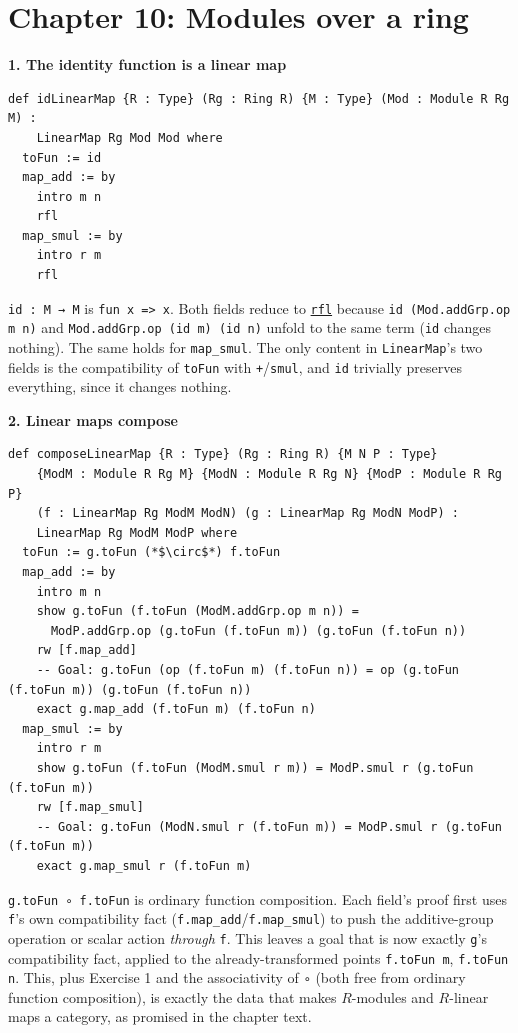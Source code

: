 \section{Chapter 10: Modules over a ring}\label{sec:14-appendix-solutions:09-chapter-10:1}

\textbf{1. The identity function is a linear map}

\begin{lstlisting}
def idLinearMap {R : Type} (Rg : Ring R) {M : Type} (Mod : Module R Rg M) :
    LinearMap Rg Mod Mod where
  toFun := id
  map_add := by
    intro m n
    rfl
  map_smul := by
    intro r m
    rfl
\end{lstlisting}

\texttt{id : M → M} is \texttt{fun x => x}. Both fields reduce to \href{https://lean-lang.org/doc/reference/latest/Tactic-Proofs/Tactic-Reference/}{\texttt{rfl}} because \texttt{id (Mod.addGrp.op m n)} and \texttt{Mod.addGrp.op (id m) (id n)} unfold to the same term (\texttt{id} changes nothing). The same holds for \texttt{map\_\allowbreak{}smul}. The only content in \texttt{LinearMap}'s two fields is the compatibility of \texttt{toFun} with \texttt{+}/\texttt{smul}, and \texttt{id} trivially preserves everything, since it changes nothing.

\textbf{2. Linear maps compose}

\begin{lstlisting}
def composeLinearMap {R : Type} (Rg : Ring R) {M N P : Type}
    {ModM : Module R Rg M} {ModN : Module R Rg N} {ModP : Module R Rg P}
    (f : LinearMap Rg ModM ModN) (g : LinearMap Rg ModN ModP) :
    LinearMap Rg ModM ModP where
  toFun := g.toFun (*$\circ$*) f.toFun
  map_add := by
    intro m n
    show g.toFun (f.toFun (ModM.addGrp.op m n)) =
      ModP.addGrp.op (g.toFun (f.toFun m)) (g.toFun (f.toFun n))
    rw [f.map_add]
    -- Goal: g.toFun (op (f.toFun m) (f.toFun n)) = op (g.toFun (f.toFun m)) (g.toFun (f.toFun n))
    exact g.map_add (f.toFun m) (f.toFun n)
  map_smul := by
    intro r m
    show g.toFun (f.toFun (ModM.smul r m)) = ModP.smul r (g.toFun (f.toFun m))
    rw [f.map_smul]
    -- Goal: g.toFun (ModN.smul r (f.toFun m)) = ModP.smul r (g.toFun (f.toFun m))
    exact g.map_smul r (f.toFun m)
\end{lstlisting}

\texttt{g.toFun ∘ f.toFun} is ordinary function composition. Each field's proof first uses \texttt{f}'s own compatibility fact (\texttt{f.map\_\allowbreak{}add}/\texttt{f.map\_\allowbreak{}smul}) to push the additive-group operation or scalar action \emph{through} \texttt{f}. This leaves a goal that is now exactly \texttt{g}'s compatibility fact, applied to the already-transformed points \texttt{f.toFun m}, \texttt{f.toFun n}. This, plus Exercise 1 and the associativity of \texttt{∘} (both free from ordinary function composition), is exactly the data that makes \(R\)-modules and \(R\)-linear maps a category, as promised in the chapter text.

